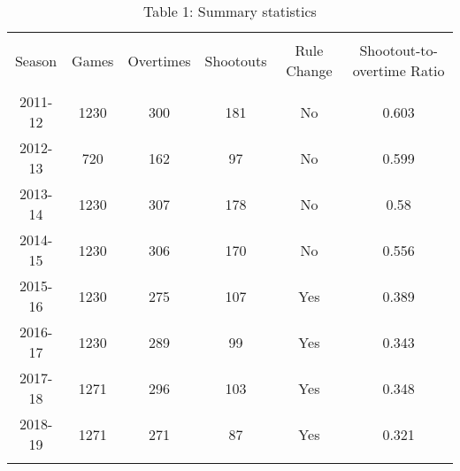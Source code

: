 
\begin{table}[!htbp] \centering 
  \caption{Table 1: Summary statistics} 
  \label{} 
\begin{tabular}{@{\extracolsep{5pt}} cccccc} 
\\[-1.8ex]\hline 
\hline \\[-1.8ex] 
Season & Games & Overtimes & Shootouts & Rule Change & Shootout-to-overtime Ratio \\ 
\hline \\[-1.8ex] 
2011-12 & 1230 & 300 & 181 & No & 0.603 \\ 
2012-13 & 720 & 162 & 97 & No & 0.599 \\ 
2013-14 & 1230 & 307 & 178 & No & 0.58 \\ 
2014-15 & 1230 & 306 & 170 & No & 0.556 \\ 
2015-16 & 1230 & 275 & 107 & Yes & 0.389 \\ 
2016-17 & 1230 & 289 & 99 & Yes & 0.343 \\ 
2017-18 & 1271 & 296 & 103 & Yes & 0.348 \\ 
2018-19 & 1271 & 271 & 87 & Yes & 0.321 \\ 
\hline \\[-1.8ex] 
\end{tabular} 
\end{table} 
